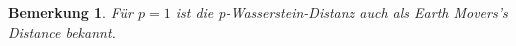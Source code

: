\documentclass[twoside, 12pt,a4paper]{book}
\def\emph#1{\textit{#1}}
\newtheorem{definition}[theorem]{Definition}
\newtheorem{remark}[theorem]{Bemerkung}
\numberwithin{equation}{section}
\begin{document}
	
	\begin{remark}
		Für $p=1$ ist die p-Wasserstein-Distanz auch als Earth Movers's Distance \cite{rubner2000earth} bekannt.
	\end{remark}

	

	
\end{document}

